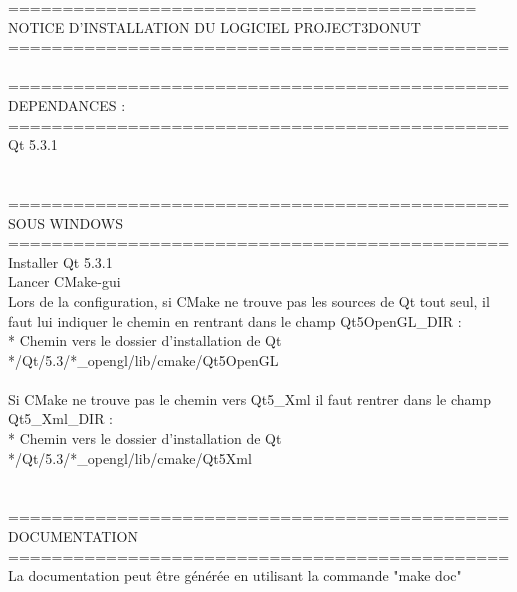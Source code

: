 ===========================================\\
NOTICE D'INSTALLATION DU LOGICIEL PROJECT3DONUT\\
==============================================\\
\\
==============================================\\
DEPENDANCES :\\
==============================================\\
Qt 5.3.1\\
\\
\\
==============================================\\
SOUS WINDOWS\\
==============================================\\
Installer Qt 5.3.1\\
Lancer CMake-gui\\
Lors de la configuration, si CMake ne trouve pas les sources de Qt tout seul, il faut lui indiquer le chemin en rentrant dans le champ Qt5OpenGL\_DIR :\\
	* Chemin vers le dossier d'installation de Qt */Qt/5.3/*\_opengl/lib/cmake/Qt5OpenGL\\
	\\
Si CMake ne trouve pas le chemin vers Qt5\_Xml il faut rentrer dans le champ Qt5\_Xml\_DIR :\\
	* Chemin vers le dossier d'installation de Qt */Qt/5.3/*\_opengl/lib/cmake/Qt5Xml\\
	\\
	\\
==============================================\\
DOCUMENTATION\\
==============================================\\
La documentation peut être générée en utilisant la commande "make doc"\\
